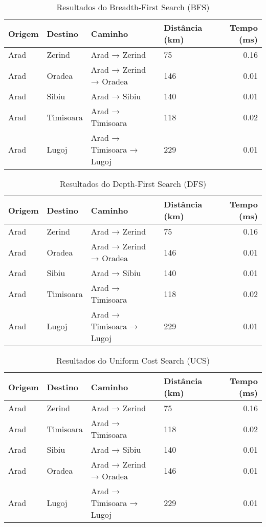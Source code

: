 \documentclass[12pt,a4paper]{article}
\begin{document}
\begin{table}[H]
\centering
\caption{Resultados do Breadth-First Search (BFS)}
\begin{tabular}{llllr}
\toprule
Origem & Destino & Caminho & Distância (km) & Tempo (ms) \\
\midrule
Arad & Zerind & Arad → Zerind & 75 & 0.16 \\
Arad & Oradea & Arad → Zerind → Oradea & 146 & 0.01 \\
Arad & Sibiu & Arad → Sibiu & 140 & 0.01 \\
Arad & Timisoara & Arad → Timisoara & 118 & 0.02 \\
Arad & Lugoj & Arad → Timisoara → Lugoj & 229 & 0.01 \\
\bottomrule
\end{tabular}
\end{table}

\begin{table}[H]
\centering
\caption{Resultados do Depth-First Search (DFS)}
\begin{tabular}{llllr}
\toprule
Origem & Destino & Caminho & Distância (km) & Tempo (ms) \\
\midrule
Arad & Zerind & Arad → Zerind & 75 & 0.16 \\
Arad & Oradea & Arad → Zerind → Oradea & 146 & 0.01 \\
Arad & Sibiu & Arad → Sibiu & 140 & 0.01 \\
Arad & Timisoara & Arad → Timisoara & 118 & 0.02 \\
Arad & Lugoj & Arad → Timisoara → Lugoj & 229 & 0.01 \\
\bottomrule
\end{tabular}
\end{table}

\begin{table}[H]
\centering
\caption{Resultados do Uniform Cost Search (UCS)}
\begin{tabular}{llllr}
\toprule
Origem & Destino & Caminho & Distância (km) & Tempo (ms) \\
\midrule
Arad & Zerind & Arad → Zerind & 75 & 0.16 \\
Arad & Timisoara & Arad → Timisoara & 118 & 0.02 \\
Arad & Sibiu & Arad → Sibiu & 140 & 0.01 \\
Arad & Oradea & Arad → Zerind → Oradea & 146 & 0.01 \\
Arad & Lugoj & Arad → Timisoara → Lugoj & 229 & 0.01 \\
\bottomrule
\end{tabular}
\end{table}
\end{document}
